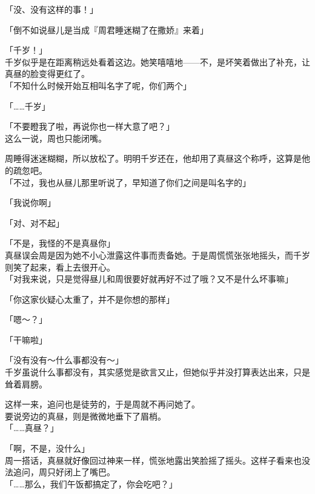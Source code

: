 「没、没有这样的事！」

「倒不如说昼儿是当成『周君睡迷糊了在撒娇』来着」

「千岁！」\\

千岁似乎是在距离稍远处看着这边。她笑嘻嘻地——不，是坏笑着做出了补充，让真昼的脸变得更红了。\\

「不知什么时候开始互相叫名字了呢，你们两个」

「……千岁」

「不要瞪我了啦，再说你也一样大意了吧？」\\

这么一说，周也只能闭嘴。

周睡得迷迷糊糊，所以放松了。明明千岁还在，他却用了真昼这个称呼，这算是他的疏忽吧。\\

「不过，我也从昼儿那里听说了，早知道了你们之间是叫名字的」

「我说你啊」

「对、对不起」

「不是，我怪的不是真昼你」\\

真昼误会周是因为她不小心泄露这件事而责备她。于是周慌慌张张地摇头，而千岁则笑了起来，看上去很开心。\\

「对我来说，只是觉得昼儿和周很要好就再好不过了哦？又不是什么坏事嘛」

「你这家伙疑心太重了，并不是你想的那样」

「嗯～？」

「干嘛啦」

「没有没有～什么事都没有～」\\

千岁虽说什么事都没有，其实感觉是欲言又止，但她似乎并没打算表达出来，只是耸着肩膀。

这样一来，追问也是徒劳的，于是周就不再问她了。\\

要说旁边的真昼，则是微微地垂下了眉梢。\\

「……真昼？」

「啊，不是，没什么」\\

周一搭话，真昼就好像回过神来一样，慌张地露出笑脸摇了摇头。这样子看来也没法追问，周只好闭上了嘴巴。\\

「……那么，我们午饭都搞定了，你会吃吧？」

